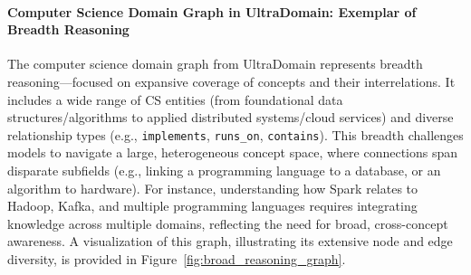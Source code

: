 \paragraph{Computer Science Domain Graph in UltraDomain: Exemplar of Breadth Reasoning}  
The computer science domain graph from UltraDomain represents breadth reasoning—focused on expansive coverage of concepts and their interrelations. It includes a wide range of CS entities (from foundational data structures/algorithms to applied distributed systems/cloud services) and diverse relationship types (e.g., \texttt{implements}, \texttt{runs\_on}, \texttt{contains}). This breadth challenges models to navigate a large, heterogeneous concept space, where connections span disparate subfields (e.g., linking a programming language to a database, or an algorithm to hardware). For instance, understanding how Spark relates to Hadoop, Kafka, and multiple programming languages requires integrating knowledge across multiple domains, reflecting the need for broad, cross-concept awareness. A visualization of this graph, illustrating its extensive node and edge diversity, is provided in Figure~\ref{fig:broad_reasoning_graph}.
